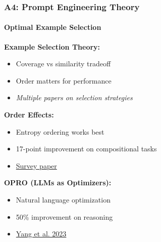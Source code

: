 \documentclass[10pt,aspectratio=169]{beamer}
\begin{document}
\begin{frame}
\frametitle{A4: Prompt Engineering Theory}
\framesubtitle{Optimal Example Selection}

\textbf{Example Selection Theory:}
\begin{itemize}
    \item Coverage vs similarity tradeoff
    \item Order matters for performance
    \item \textit{Multiple papers on selection strategies}
\end{itemize}

\vspace{0.5cm}
\textbf{Order Effects:}
\begin{itemize}
    \item Entropy ordering works best
    \item 17-point improvement on compositional tasks
    \item \href{papers/2402.07927_prompt_engineering_survey.pdf}{\color{blue}Survey paper}
\end{itemize}

\vspace{0.5cm}
\textbf{OPRO (LLMs as Optimizers):}
\begin{itemize}
    \item Natural language optimization
    \item 50\% improvement on reasoning
    \item \href{papers/2309.03409_llms_as_optimizers.pdf}{\color{blue}Yang et al. 2023}
\end{itemize}
\end{frame}
\end{document}
